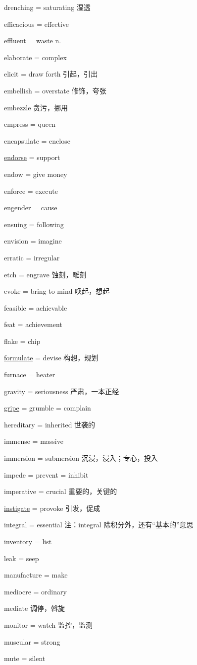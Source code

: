\documentclass[UTF8, fontset = none, zihao = -4, linespread = 1.1]{ctexart}
\begin{document}
\begin{multicols}{2}
drenching = saturating 湿透

efficacious = effective

effluent = waste n.

elaborate = complex

elicit = draw forth 引起，引出

embellish = overstate 修饰，夸张

embezzle 贪污，挪用

empress = queen

encapsulate = enclose

\underline{endorse} = support

endow = give money

enforce = execute

engender = cause

ensuing = following

envision = imagine

erratic = irregular

etch = engrave 蚀刻，雕刻

evoke = bring to mind 唤起，想起

feasible = achievable

feat = achievement

flake = chip

\underline{formulate} = devise 构想，规划

furnace = heater

gravity = seriousness 严肃，一本正经

\underline{gripe} = grumble = complain

hereditary = inherited 世袭的

immense = massive

immersion = submersion 沉浸，浸入；专心，投入

impede = prevent = inhibit

imperative = crucial 重要的，关键的

\underline{instigate} = provoke 引发，促成

integral = essential 注：integral 除积分外，还有“基本的”意思

inventory = list

leak = seep

manufacture = make

mediocre = ordinary

mediate 调停，斡旋

monitor = watch 监控，监测

muscular = strong

mute = silent


\end{multicols}
\end{document}
